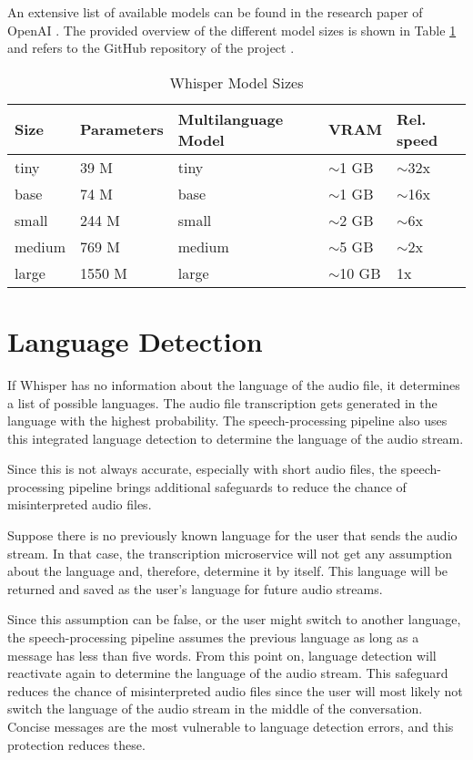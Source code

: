 An extensive list of available models can be found in the research paper of OpenAI \cite{radford2022robust}. 
The provided overview of the different model sizes is shown in Table \ref{tab:whisper-model-sizes} and refers to the 
GitHub repository of the project \cite{whisper2022github}.

\begin{table}[ht]
	\centering
	\begin{tabular}{|l|l|l|l|l|}
		\hline
		Size & Parameters & Multilanguage Model & VRAM & Rel. speed \\
		\hline
		tiny & 39 M & tiny & $\sim$1 GB & $\sim$32x \\
		base & 74 M & base & $\sim$1 GB & $\sim$16x \\
		small & 244 M & small & $\sim$2 GB & $\sim$6x \\
		medium & 769 M & medium & $\sim$5 GB & $\sim$2x \\
		large & 1550 M & large & $\sim$10 GB & 1x \\
		\hline
	\end{tabular}
	\caption{Whisper Model Sizes}
	\label{tab:whisper-model-sizes}
\end{table}


\section{Language Detection}

If Whisper has no information about the language of the audio file, it determines a list of possible languages. The 
audio file transcription gets generated in the language with the highest probability. The speech-processing pipeline 
also uses this integrated language detection to determine the language of the audio stream.

Since this is not always accurate, especially with short audio files, the speech-processing pipeline brings additional 
safeguards to reduce the chance of misinterpreted audio files.

Suppose there is no previously known language for the user that sends the audio stream. In that case, the transcription 
microservice will not get any assumption about the language and, therefore, determine it by itself. This language will 
be returned and saved as the user's language for future audio streams.

Since this assumption can be false, or the user might switch to another language, the speech-processing pipeline 
assumes the previous language as long as a message has less than five words. From this point on, language detection 
will reactivate again to determine the language of the audio stream. This safeguard reduces the chance of 
misinterpreted audio files since the user will most likely not switch the language of the audio stream in the middle 
of the conversation. Concise messages are the most vulnerable to language detection errors, and this protection 
reduces these.

